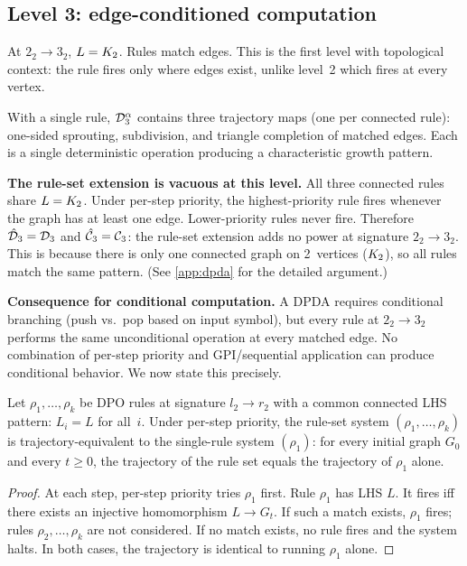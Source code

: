 \documentclass{../shared/primo}
\begin{document}
\subsection{Level 3: edge-conditioned computation}
\label{sec:level3}

At $2_2 \to 3_2$, $L = K_{2}$. Rules match edges. This is the first level with topological context: the rule fires only where edges exist, unlike level~2 which fires at every vertex.

With a single rule, $\mathcal{D}_{3}^{\alpha}$ contains three trajectory maps (one per connected rule): one-sided sprouting, subdivision, and triangle completion of matched edges. Each is a single deterministic operation producing a characteristic growth pattern.

\textbf{The rule-set extension is vacuous at this level.} All three connected rules share $L = K_{2}$. Under per-step priority, the highest-priority rule fires whenever the graph has at least one edge. Lower-priority rules never fire. Therefore $\hat{\mathcal{D}}_{3} = \mathcal{D}_{3}$ and $\hat{\mathcal{C}}_{3} = \mathcal{C}_{3}$: the rule-set extension adds no power at signature $2_2 \to 3_2$. This is because there is only one connected graph on 2~vertices ($K_{2}$), so all rules match the same pattern. (See \cref{app:dpda} for the detailed argument.)

\textbf{Consequence for conditional computation.} A DPDA requires conditional branching (push vs.\ pop based on input symbol), but every rule at $2_2 \to 3_2$ performs the same unconditional operation at every matched edge. No combination of per-step priority and GPI/sequential application can produce conditional behavior. We now state this precisely.

\begin{lemma}\label{lem:uniform}
Let $\rho_1, \ldots, \rho_k$ be DPO rules at signature $l_2 \to r_2$ with a common connected LHS pattern: $L_i = L$ for all~$i$. Under per-step priority, the rule-set system $(\rho_1, \ldots, \rho_k)$ is trajectory-equivalent to the single-rule system $(\rho_1)$: for every initial graph $G_0$ and every $t \geq 0$, the trajectory of the rule set equals the trajectory of $\rho_1$ alone.
\end{lemma}

\begin{proof}
At each step, per-step priority tries $\rho_1$ first. Rule $\rho_1$ has LHS $L$. It fires iff there exists an injective homomorphism $L \to G_t$. If such a match exists, $\rho_1$ fires; rules $\rho_2, \ldots, \rho_k$ are not considered. If no match exists, no rule fires and the system halts. In both cases, the trajectory is identical to running $\rho_1$ alone.
\end{proof}
\end{document}
